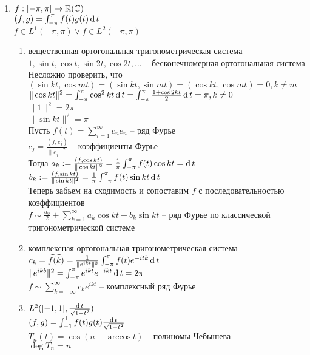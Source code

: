 \documentclass[12pt]{article}
\begin{document}
\begin{enumerate}
    \item $f: [-\pi, \pi] \rightarrow \mathbb{R}(\mathbb{C})$\\
    $(f,g) = \int_{-\pi}^\pi f(t)g(t)\operatorname{d} t$\\
    $f \in L^1(-\pi, \pi) \lor f \in L^2(-\pi, \pi)$\\
    \begin{enumerate}
        \item вещественная ортогональная тригонометрическая система\\
        $1, \sin t, \cos t, \sin 2t, \cos 2t, \ldots$ -- бесконечномерная ортогональная система\\
        Несложно проверить, что $(\sin kt, \cos mt) = (\sin kt, \sin mt) = (\cos kt, \cos mt) = 0, k \neq m$\\
        $\|\cos kt\|^2 = \int_{-\pi}^\pi \cos^2 kt \operatorname{d} t = \int_{-\pi}^\pi \frac{1+\cos 2kt}2 \operatorname{d} t = \pi, k \neq 0$\\
        $\|1\|^2 = 2\pi$\\
        $\|\sin kt\|^2 = \pi$\\
        Пусть $f(t) = \sum_{i=1}^\infty c_n e_n$ -- ряд Фурье\\
        $c_j = \frac{(f, e_j)}{\|e_j\|^2}$ -- коэффициенты Фурье\\
        Тогда $a_k := \frac{(f, \cos kt)}{\|\cos kt\|^2} = \frac1\pi \int_{-\pi}^\pi f(t)\cos kt = \operatorname{d} t$\\
        $b_k := \frac{(f, \sin kt)}{\|\sin kt\|^2} = \frac1\pi \int_{-\pi}^\pi f(t) \sin kt \operatorname{d} t$\\
        Теперь забьем на сходимость и сопоставим $f$ с последовательностью коэффициентов\\
        $f \sim \frac{a_0}2 + \sum_{k=1}^\infty a_k \cos kt + b_k \sin kt$ -- ряд Фурье по классической тригонометрической системе
        \item комплексная ортогональная тригонометрическая система\\
        $c_k = \widehat{f(k)} = \frac1{\|e^{ikt}\|^2}\int_{-\pi}^{\pi} f(t)e^{-itk}\operatorname{d} t$\\
        $\|e^{ikb}\|^2 = \int_{-\pi}^\pi e^{ikt}e^{-ikt} \operatorname{d} t = 2\pi$\\
        $f \sim \sum_{k=-\infty}^\infty c_k e^{ikt}$ -- комплексный ряд Фурье\\
        \item $L^2([-1,1], \frac{\operatorname{d} t}{\sqrt{1-t^2}})$\\
        $(f,g) = \int_{-1}^1 f(t)g(t)\frac{\operatorname{d} t}{\sqrt{1-t^2}}$\\
        $T_n(t) = \cos(n-\arccos t)$ -- полиномы Чебышева\\
        $\deg T_n = n$
    \end{enumerate}
\end{enumerate}
\end{document}

